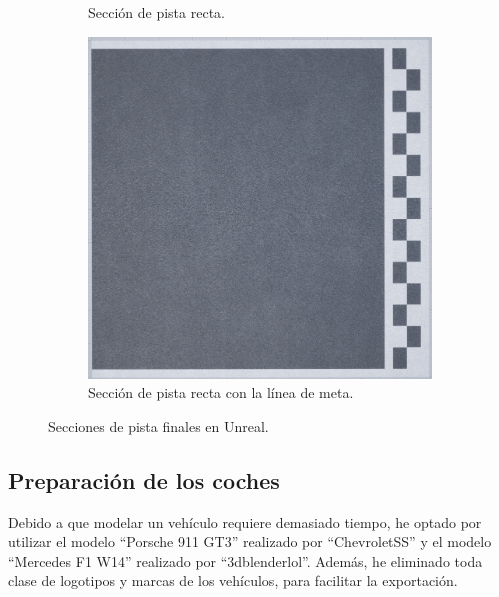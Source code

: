 \begin{figure}[H]
\begin{subfigure}[t]{0.48\textwidth}
        \caption{Sección de pista recta.}
        \label{fig:curvafinal1}
    \end{subfigure}
    \hfill
    \begin{subfigure}[t]{0.48\textwidth}
        \centering
        \includegraphics[width=\textwidth]{imagenes/converted/pista/track-finish-line-final.jpg}
        \caption{Sección de pista recta con la línea de meta.}
        \label{fig:curvafinishlinefinal}
    \end{subfigure}

    \caption{Secciones de pista finales en Unreal.}
    \label{fig:seccionespista}
\end{figure}

\newpage

\subsection{Preparación de los coches}

Debido a que modelar un vehículo requiere demasiado tiempo, he optado por utilizar el modelo ``Porsche 911 GT3''\cite{porsche} realizado por ``ChevroletSS'' y el modelo ``Mercedes F1 W14''\cite{f1} realizado por ``3dblenderlol''. Además, he eliminado toda clase de logotipos y marcas de los vehículos, para facilitar la exportación.

\bigskip

